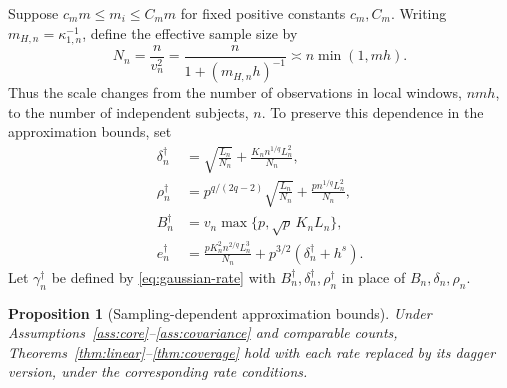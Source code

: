 \documentclass[10pt]{book}
\newtheorem{proposition}{Proposition}
\numberwithin{equation}{section}
\begin{document}
Suppose $c_m m\le m_i\le C_m m$ for fixed positive constants $c_m,C_m$.
Writing $m_{H,n}=\kappa_{1,n}^{-1}$, define the effective sample size by
\begin{equation}
N_n=\frac{n}{v_n^2}=\frac{n}{1+(m_{H,n}h)^{-1}}
\asymp n\min(1,mh).
\label{eq:effective-sample-size}
\end{equation}
Thus the scale changes from the number of observations in local windows,
$nmh$, to the number of independent subjects, $n$. To preserve this
dependence in the approximation bounds, set
\begin{equation*}
\begin{aligned}
\delta_n^\dagger&=\sqrt{\frac{L_n}{N_n}}
+\frac{K_n n^{1/q}L_n^2}{N_n},\\
\rho_n^\dagger&=p^{q/(2q-2)}\sqrt{\frac{L_n}{N_n}}
+\frac{p n^{1/q}L_n^2}{N_n},\\
B_n^\dagger&=v_n\max\{p,\sqrt p\,K_nL_n\},\\
e_n^\dagger&=\frac{pK_n^2 n^{2/q}L_n^3}{N_n}
+p^{3/2}(\delta_n^\dagger+h^s).
\end{aligned}
\end{equation*}
Let $\gamma_n^\dagger$ be defined by
\eqref{eq:gaussian-rate} with $B_n^\dagger,\delta_n^\dagger,\rho_n^\dagger$
in place of $B_n,\delta_n,\rho_n$.

\begin{proposition}[Sampling-dependent approximation bounds]
\label{prop:sampling-rates}
Under Assumptions~\ref{ass:core}--\ref{ass:covariance} and comparable counts,
Theorems~\ref{thm:linear}--\ref{thm:coverage} hold with each rate
replaced by its dagger version, under the corresponding rate conditions.
\end{proposition}
\end{document}
